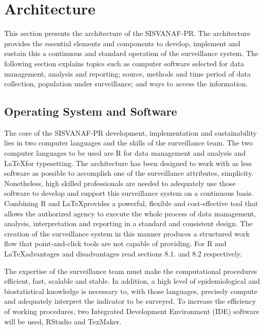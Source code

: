 \documentclass[12pt,letterpaper]{report}
\begin{document}
\section{Architecture}

This section presents the architecture of the SISVANAF-PR.  The architecture provides the essential elements and components to develop, implement and sustain this a continuous and standard operation of the surveillance system. The following section explains topics such as computer software selected for data management, analysis and reporting; source, methods and time period of data collection, population under surveillance; and ways to access the information. 

\subsection{Operating System and Software}

The core of the SISVANAF-PR development, implementation and sustainability lies in two computer languages and the skills of the surveillance team.  The two computer languages to be used are R for data management and analysis and \LaTeX  for typesetting.  The architecture has been designed to work with as less software as possible to accomplish one of the surveillance attributes, simplicity. Nonetheless, high skilled professionals are needed to adequately use those software to develop and support this surveillance system on a continuous basis.  Combining R and \LaTeX provides a powerful, flexible and cost-effective tool that allows the authorized agency to execute the whole process of data management, analysis, interpretation and reporting in a standard and consistent design.  The creation of the surveillance system in this manner produces a structured work flow that point-and-click tools are not capable of providing. For R and \LaTeX advantages and disadvantages read sections 8.1. and 8.2 respectively.

The expertise of the surveillance team must make the computational procedures efficient, fast, scalable and stable.  In addition, a high level of epidemiological and biostatistical knowledge is necessary to, with those languages, precisely compute and adequately interpret the indicator to be surveyed. To increase the efficiency of working procedures, two Integrated Development Environment (IDE) software will be used, RStudio and TexMaker. 
\end{document}
